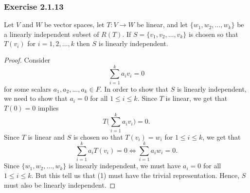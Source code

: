 \subsubsection{Exercise 2.1.13} Let \( V  \) and \( W  \) be vector spaces, let \( T: V \to W  \) be linear, and let \( \{ w_{1}, w_{2}, \dots, w_{k } \}  \) be a linearly independent subset of \( R(T) \). If \( S = \{ v_{1}, v_{2}, \dots, v_{k} \}  \) is chosen so that \( T(v_{i}) \) for \( i = 1,2,\dots, k  \) then \( S  \) is linearly independent.
\begin{proof}
    Consider
    \[  \sum_{ i=1 }^{ k  } a_{i} v_{i} = 0 \tag{1}  \]
    for some scalars \( a_{1}, a_{2}, \dots, a_{k } \in F  \). In order to show that \( S  \) is linearly independent, we need to show that \( a_{i} = 0   \) for all \( 1 \leq i \leq k  \). Since \( T  \) is linear, we get that \( T(0) = 0  \) implies
    \[  T \Big( \sum_{ i=1 }^{ k  } a_{i} v_{i} \Big) = 0.  \]
    Since \( T  \) is linear and \( S  \) is chosen so that \( T(v_{i}) = w_{i}  \) for \( 1 \leq i \leq k  \), we get that
    \[  \sum_{ i=1 }^{ k  } a_{i} T(v_{i}) =  0 \iff \sum_{ i=1 }^{ k  } a_{i} w_{i} = 0.   \]
    Since \( \{ w_{1}, w_{2}, \dots, w_{k} \}  \) is linearly independent, we must have \( a_{i} = 0  \) for all \( 1 \leq i \leq k  \). But this tell us that (1) must have the trivial representation. Hence, \( S  \) must also be linearly independent. 
\end{proof}

